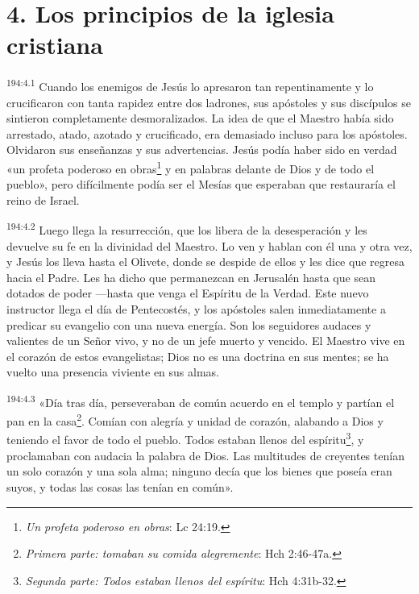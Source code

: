\section*{4. Los principios de la iglesia cristiana}
\par 
\textsuperscript{194:4.1} Cuando los enemigos de Jesús lo apresaron tan repentinamente y lo crucificaron con tanta rapidez entre dos ladrones, sus apóstoles y sus discípulos se sintieron completamente desmoralizados. La idea de que el Maestro había sido arrestado, atado, azotado y crucificado, era demasiado incluso para los apóstoles. Olvidaron sus enseñanzas y sus advertencias. Jesús podía haber sido en verdad «un profeta poderoso en obras\footnote{\textit{Un profeta poderoso en obras}: Lc 24:19.} y en palabras delante de Dios y de todo el pueblo», pero difícilmente podía ser el Mesías que esperaban que restauraría el reino de Israel.

\par 
\textsuperscript{194:4.2} Luego llega la resurrección, que los libera de la desesperación y les devuelve su fe en la divinidad del Maestro. Lo ven y hablan con él una y otra vez, y Jesús los lleva hasta el Olivete, donde se despide de ellos y les dice que regresa hacia el Padre. Les ha dicho que permanezcan en Jerusalén hasta que sean dotados de poder ---hasta que venga el Espíritu de la Verdad. Este nuevo instructor llega el día de Pentecostés, y los apóstoles salen inmediatamente a predicar su evangelio con una nueva energía. Son los seguidores audaces y valientes de un Señor vivo, y no de un jefe muerto y vencido. El Maestro vive en el corazón de estos evangelistas; Dios no es una doctrina en sus mentes; se ha vuelto una presencia viviente en sus almas.

\par 
\textsuperscript{194:4.3} «Día tras día, perseveraban de común acuerdo en el templo y partían el pan en la casa\footnote{\textit{Primera parte: tomaban su comida alegremente}: Hch 2:46-47a.}. Comían con alegría y unidad de corazón, alabando a Dios y teniendo el favor de todo el pueblo. Todos estaban llenos del espíritu\footnote{\textit{Segunda parte: Todos estaban llenos del espíritu}: Hch 4:31b-32.}, y proclamaban con audacia la palabra de Dios. Las multitudes de creyentes tenían un solo corazón y una sola alma; ninguno decía que los bienes que poseía eran suyos, y todas las cosas las tenían en común».

